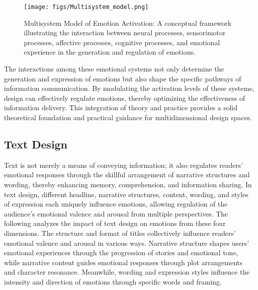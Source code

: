 \begin{figure}[hbt!]
\setlength{\intextsep}{10pt plus 2pt minus 2pt}
    \centering
    \texttt{[image: figs/Multisystem\_model.png]}
    \caption{Multisystem Model of Emotion Activation: A conceptual framework illustrating the interaction between neural processes, sensorimotor processes, affective processes, cognitive processes, and emotional experience in the generation and regulation of emotions.}
   \vspace{-2mm}
\label{fig:What}
\end{figure}

The interactions among these emotional systems not only determine the generation and expression of emotions but also shape the specific pathways of information communication. By modulating the activation levels of these systems, design can effectively regulate emotions, thereby optimizing the effectiveness of information delivery. This integration of theory and practice provides a solid theoretical foundation and practical guidance for multidimensional design spaces.

\subsection{Text Design}
Text is not merely a means of conveying information; it also regulates readers’ emotional responses through the skillful arrangement of narrative structures and wording, thereby enhancing memory, comprehension, and information sharing. In text design, different headline, narrative structures, content, wording, and styles of expression each uniquely influence emotions, allowing regulation of the audience’s emotional valence and arousal from multiple perspectives. The following analyzes the impact of text design on emotions from these four dimensions. The structure and format of titles collectively influence readers’ emotional valence and arousal in various ways. Narrative structure shapes users’ emotional experiences through the progression of stories and emotional tone, while narrative content guides emotional responses through plot arrangements and character resonance. Meanwhile, wording and expression styles influence the intensity and direction of emotions through specific words and framing.

